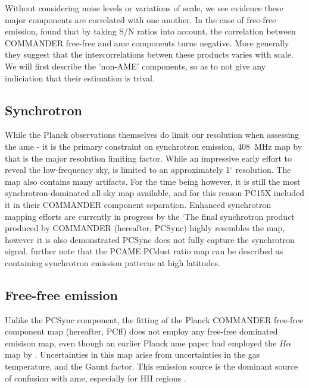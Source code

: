         Without considering noise levels or variations of scale, we see evidence these major components are correlated with one another. In the case of free-free emission,  \cite{vonHausegger15} found that by taking S/N ratios into account, the correlation between COMMANDER free-free and \acrshort{ame} components turns negative. More generally they suggest that the intercorrelations betwen these products varies with scale. We will first describe the 'non-AME' components, so as to not give any indiciation that their estimation is trival.

       \subsection{Synchrotron}
          While the Planck observations themselves do limit our resolution when assessing the \acrshort{ame} - it is the primary constraint on synchrotron emission, 408~MHz map by \cite{haslam82} that is the major resolution limiting factor. While an impressive early effort to reveal the low-frequency sky, \citep{haslam82} is limited to an approximately 1$^{\circ}$ resolution. The map also contains many artifacts. For the time being however, it is still the most synchrotron-dominated all-sky map available, and for this reason PC15X included it in their COMMANDER component separation. Enhanced synchrotron mapping efforts are currently in progress by the `The final synchrotron product produced by COMMANDER (hereafter, PCSync) highly resembles the \cite{haslam82} map, however it is also demonstrated PCSync does not fully capture the synchrotron signal. \cite{hensley16} further note that the PCAME:PCdust ratio map can be described as containing synchrotron emission patterns at high latitudes.

       \subsection{Free-free emission}
          Unlike the PCSync component, the fitting of the Planck COMMANDER free-free component map (hereafter, PCff) does not employ any free-free dominated emisison map, even though an earlier Planck \acrshort{ame} paper \citep{planckXV} had employed the $H\alpha$ map by \cite{finkbeiner03}. Uncertainties in this map arise from uncertainties in the gas temperature, and the Gaunt factor. This emission source is the dominant source of confusion with \acrshort{ame}, especially for HII regions \citep{planckXV,planckXII, paladini15}.

